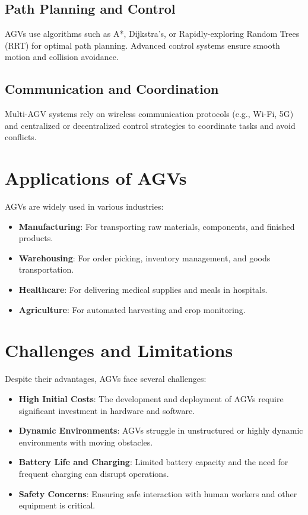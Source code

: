 \documentclass[main]{subfiles}
\begin{document}
\subsection{Path Planning and Control}
AGVs use algorithms such as A*, Dijkstra's, or Rapidly-exploring Random Trees (RRT) for optimal path planning. Advanced control systems ensure smooth motion and collision avoidance.

\subsection{Communication and Coordination}
Multi-AGV systems rely on wireless communication protocols (e.g., Wi-Fi, 5G) and centralized or decentralized control strategies to coordinate tasks and avoid conflicts.

\section{Applications of AGVs}
AGVs are widely used in various industries:
\begin{itemize}
    \item \textbf{Manufacturing}: For transporting raw materials, components, and finished products.
    \item \textbf{Warehousing}: For order picking, inventory management, and goods transportation.
    \item \textbf{Healthcare}: For delivering medical supplies and meals in hospitals.
    \item \textbf{Agriculture}: For automated harvesting and crop monitoring.
\end{itemize}

\section{Challenges and Limitations}
Despite their advantages, AGVs face several challenges:
\begin{itemize}
    \item \textbf{High Initial Costs}: The development and deployment of AGVs require significant investment in hardware and software.
    \item \textbf{Dynamic Environments}: AGVs struggle in unstructured or highly dynamic environments with moving obstacles.
    \item \textbf{Battery Life and Charging}: Limited battery capacity and the need for frequent charging can disrupt operations.
    \item \textbf{Safety Concerns}: Ensuring safe interaction with human workers and other equipment is critical.
\end{itemize}
\end{document}
